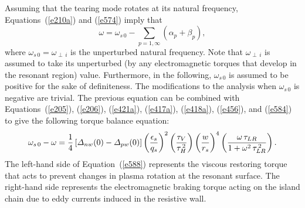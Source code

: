 \documentclass[notitlepage,12pt]{article}
\begin{document}
Assuming that the tearing mode rotates at its natural frequency, Equations~(\ref{e210a}) and (\ref{e574}) imply that
\begin{equation}
\omega = \omega_{s\,0} -\sum_{p=1,\infty}(\alpha_p+\beta_p),
\end{equation}
where $\omega_{s\,0}=\omega_{\perp\,i}$ is the unperturbed natural frequency. Note that $\omega_{\perp\,i}$ is
assumed to take its unperturbed (by any electromagnetic torques that develop in the resonant region) value. Furthermore, in the following, $\omega_{s\,0}$ is
assumed to be positive for the sake of definiteness. The modifications to the analysis when $\omega_{s\,0}$ is
negative are trivial. 
The previous equation can be combined with Equations~(\ref{e205}), (\ref{e206}), (\ref{e421a}), (\ref{e417a}), (\ref{e418a}), (\ref{e456}),
and (\ref{e584}) to give the following torque balance equation:
\begin{equation}\label{e588}
\omega_{s\,0} - \omega = \frac{1}{4}\,[{\mit\Delta}_{nw}(0)-{\mit\Delta}_{pw}(0)]
\left(\frac{\epsilon_s}{q_s}\right)^2\left(\frac{\tau_V}{\tau_H^{\,2}}\right)\left(\frac{w}{r_s}\right)^4\left(\frac{\omega\,\tau_{LR}}{1+\omega^2\,\tau_{LR}^{\,2}}\right).
\end{equation}
The left-hand side of Equation~(\ref{e588}) represents the viscous restoring torque that acts to prevent changes in plasma rotation at the resonant surface. The right-hand side represents the electromagnetic braking torque acting on the island chain due to eddy currents induced in the
resistive wall. 
\end{document}
